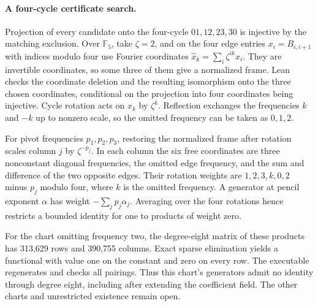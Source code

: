 \paragraph{A four-cycle certificate search.}
Projection of every candidate onto the four-cycle \(01,12,23,30\)
is injective by the matching exclusion. Over \(\mathbb F_5\), take
\(\zeta=2\), and on the four edge entries \(x_i=B_{i,i+1}\) with
indices modulo four use Fourier coordinates
\(\widehat x_k=\sum_i\zeta^{ik}x_i\).
They are invertible coordinates, so some three of them give a
normalized frame. Lean checks the coordinate deletion and the
resulting isomorphism onto the three chosen coordinates, conditional
on the projection into four coordinates being injective.
Cycle rotation acts on \(\widehat x_k\) by
\(\zeta^k\). Reflection exchanges the frequencies \(k\) and \(-k\)
up to nonzero scale, so the omitted frequency can be taken as
\(0,1,2\).

For pivot frequencies \(p_1,p_2,p_3\), restoring the normalized
frame after rotation scales column \(j\) by \(\zeta^{-p_j}\).
In each column the six free coordinates are three nonconstant
diagonal frequencies, the omitted edge frequency, and the sum and
difference of the two opposite edges. Their rotation weights are
\(1,2,3,k,0,2\) minus \(p_j\) modulo four, where \(k\) is the omitted
frequency. A generator at pencil exponent \(\alpha\) has weight
\(-\sum_j p_j\alpha_j\). Averaging over the four rotations hence
restricts a bounded identity for one to products of weight zero.

For the chart omitting frequency two, the degree-eight matrix of
these products has 313,629 rows and 390,755 columns. Exact sparse
elimination yields a functional with value one on the constant
and zero on every row. The executable regenerates and checks all
pairings. Thus this chart's generators admit no identity through
degree eight, including after extending the coefficient field.
The other charts and unrestricted existence remain open.
